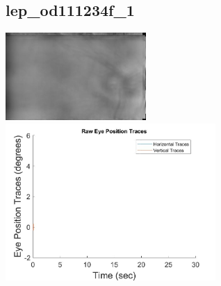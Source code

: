 \documentclass[11pt]{article}
\begin{document}
\subsection{lep\_od111234f\_1}
\includegraphics[width=0.40\textwidth, valign=m]{referenceframes/rodenstock_amd/lep_od111234f_1_dwt_nostim_gamscaled_bandfilt_refframe.jpg}
\includegraphics[width=0.60\textwidth, valign=m]{eyepositiontraces/rodenstock_amd/lep_od111234f_1.jpg}\\
\end{document}
